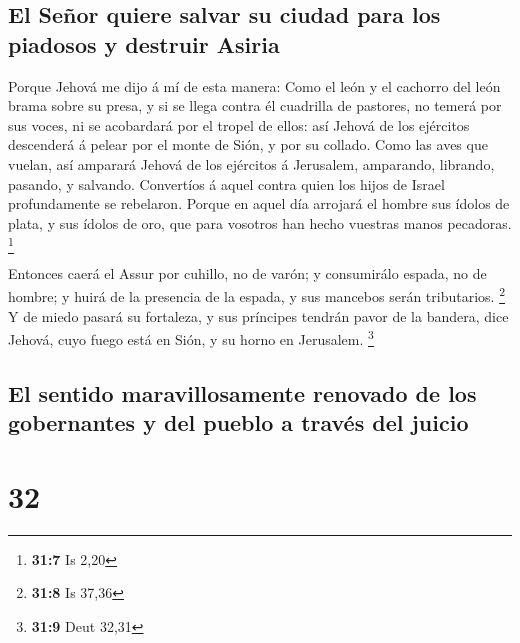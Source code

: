 \hypertarget{el-seuxf1or-quiere-salvar-su-ciudad-para-los-piadosos-y-destruir-asiria}{%
\subsection{El Señor quiere salvar su ciudad para los piadosos y
destruir
Asiria}\label{el-seuxf1or-quiere-salvar-su-ciudad-para-los-piadosos-y-destruir-asiria}}

 Porque Jehová me dijo á mí de esta manera: Como el león y
el cachorro del león brama sobre su presa, y si se llega contra él
cuadrilla de pastores, no temerá por sus voces, ni se acobardará por el
tropel de ellos: así Jehová de los ejércitos descenderá á pelear por el
monte de Sión, y por su collado.  Como las aves que
vuelan, así amparará Jehová de los ejércitos á Jerusalem, amparando,
librando, pasando, y salvando.  Convertíos á aquel contra
quien los hijos de Israel profundamente se rebelaron. 
Porque en aquel día arrojará el hombre sus ídolos de plata, y sus ídolos
de oro, que para vosotros han hecho vuestras manos pecadoras.
\footnote{\textbf{31:7} Is 2,20}

 Entonces caerá el Assur por cuhillo, no de varón; y
consumirálo espada, no de hombre; y huirá de la presencia de la espada,
y sus mancebos serán tributarios. \footnote{\textbf{31:8} Is 37,36}
 Y de miedo pasará su fortaleza, y sus príncipes tendrán
pavor de la bandera, dice Jehová, cuyo fuego está en Sión, y su horno en
Jerusalem. \footnote{\textbf{31:9} Deut 32,31}

\hypertarget{el-sentido-maravillosamente-renovado-de-los-gobernantes-y-del-pueblo-a-travuxe9s-del-juicio}{%
\subsection{El sentido maravillosamente renovado de los gobernantes y
del pueblo a través del
juicio}\label{el-sentido-maravillosamente-renovado-de-los-gobernantes-y-del-pueblo-a-travuxe9s-del-juicio}}

\hypertarget{section-31}{%
\section{32}\label{section-31}}

